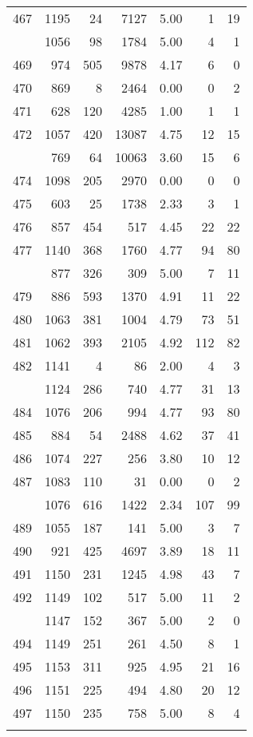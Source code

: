 \documentclass[
]{article}
\begin{document}
\begin{table}
\begin{tabular}[t]{lrrrrrr}
467 & 1195 & 24 & 7127 & 5.00 & 1 & 19\\
\addlinespace
468 & 1056 & 98 & 1784 & 5.00 & 4 & 1\\
469 & 974 & 505 & 9878 & 4.17 & 6 & 0\\
470 & 869 & 8 & 2464 & 0.00 & 0 & 2\\
471 & 628 & 120 & 4285 & 1.00 & 1 & 1\\
472 & 1057 & 420 & 13087 & 4.75 & 12 & 15\\
\addlinespace
473 & 769 & 64 & 10063 & 3.60 & 15 & 6\\
474 & 1098 & 205 & 2970 & 0.00 & 0 & 0\\
475 & 603 & 25 & 1738 & 2.33 & 3 & 1\\
476 & 857 & 454 & 517 & 4.45 & 22 & 22\\
477 & 1140 & 368 & 1760 & 4.77 & 94 & 80\\
\addlinespace
478 & 877 & 326 & 309 & 5.00 & 7 & 11\\
479 & 886 & 593 & 1370 & 4.91 & 11 & 22\\
480 & 1063 & 381 & 1004 & 4.79 & 73 & 51\\
481 & 1062 & 393 & 2105 & 4.92 & 112 & 82\\
482 & 1141 & 4 & 86 & 2.00 & 4 & 3\\
\addlinespace
483 & 1124 & 286 & 740 & 4.77 & 31 & 13\\
484 & 1076 & 206 & 994 & 4.77 & 93 & 80\\
485 & 884 & 54 & 2488 & 4.62 & 37 & 41\\
486 & 1074 & 227 & 256 & 3.80 & 10 & 12\\
487 & 1083 & 110 & 31 & 0.00 & 0 & 2\\
\addlinespace
488 & 1076 & 616 & 1422 & 2.34 & 107 & 99\\
489 & 1055 & 187 & 141 & 5.00 & 3 & 7\\
490 & 921 & 425 & 4697 & 3.89 & 18 & 11\\
491 & 1150 & 231 & 1245 & 4.98 & 43 & 7\\
492 & 1149 & 102 & 517 & 5.00 & 11 & 2\\
\addlinespace
493 & 1147 & 152 & 367 & 5.00 & 2 & 0\\
494 & 1149 & 251 & 261 & 4.50 & 8 & 1\\
495 & 1153 & 311 & 925 & 4.95 & 21 & 16\\
496 & 1151 & 225 & 494 & 4.80 & 20 & 12\\
497 & 1150 & 235 & 758 & 5.00 & 8 & 4\\
\addlinespace

\end{tabular}
\end{table}
\end{document}
